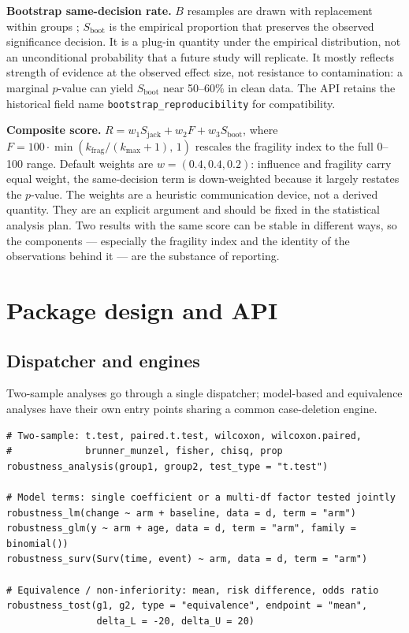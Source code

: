 \textbf{Bootstrap same-decision rate.} \(B\) resamples are drawn with replacement
within groups \citep{efron1993}; \(S_\mathrm{boot}\) is the empirical proportion that
preserves the observed significance decision. It is a plug-in quantity under
the empirical distribution, not an unconditional probability that a future
study will replicate. It mostly reflects strength of evidence at the observed
effect size, not resistance to contamination: a marginal \(p\)-value can yield
\(S_\mathrm{boot}\) near 50--60\% in clean data. The API retains the historical
field name \texttt{bootstrap\_reproducibility} for compatibility.

\textbf{Composite score.}
\(R = w_1 S_\mathrm{jack} + w_2 F + w_3 S_\mathrm{boot}\), where
\(F = 100 \cdot \min\!\left(k_\mathrm{frag} / (k_{\max}+1),\, 1\right)\)
rescales the fragility index to the full 0--100 range. Default weights are
\(w = (0.4, 0.4, 0.2)\): influence and fragility carry equal weight, the
same-decision term is down-weighted because it largely restates the
\(p\)-value. The weights are a heuristic communication device, not a derived
quantity. They are an explicit argument and should be fixed in the statistical
analysis plan. Two results with the same score can be stable in different
ways, so the components --- especially the fragility index and the identity of
the observations behind it --- are the substance of reporting.

\section{Package design and API}\label{package-design-and-api}

\subsection{Dispatcher and engines}\label{dispatcher-and-engines}

Two-sample analyses go through a single dispatcher; model-based and
equivalence analyses have their own entry points sharing a common
case-deletion engine.

\begin{verbatim}
# Two-sample: t.test, paired.t.test, wilcoxon, wilcoxon.paired,
#             brunner_munzel, fisher, chisq, prop
robustness_analysis(group1, group2, test_type = "t.test")

# Model terms: single coefficient or a multi-df factor tested jointly
robustness_lm(change ~ arm + baseline, data = d, term = "arm")
robustness_glm(y ~ arm + age, data = d, term = "arm", family = binomial())
robustness_surv(Surv(time, event) ~ arm, data = d, term = "arm")

# Equivalence / non-inferiority: mean, risk difference, odds ratio
robustness_tost(g1, g2, type = "equivalence", endpoint = "mean",
                delta_L = -20, delta_U = 20)
\end{verbatim}

